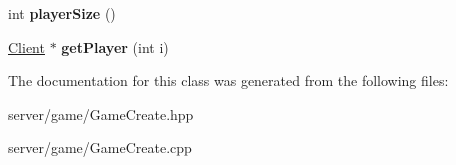 \begin{DoxyCompactItemize}
\item 
\hypertarget{class_game_create_aef11f90cb79e6044e1264f8085f52c65}{int {\bfseries player\-Size} ()}\label{class_game_create_aef11f90cb79e6044e1264f8085f52c65}

\item 
\hypertarget{class_game_create_afb023b927510ae776d6742cba967f52c}{\hyperlink{class_client}{Client} $\ast$ {\bfseries get\-Player} (int i)}\label{class_game_create_afb023b927510ae776d6742cba967f52c}

\end{DoxyCompactItemize}


The documentation for this class was generated from the following files\-:\begin{DoxyCompactItemize}
\item 
server/game/Game\-Create.\-hpp\item 
server/game/Game\-Create.\-cpp\end{DoxyCompactItemize}
